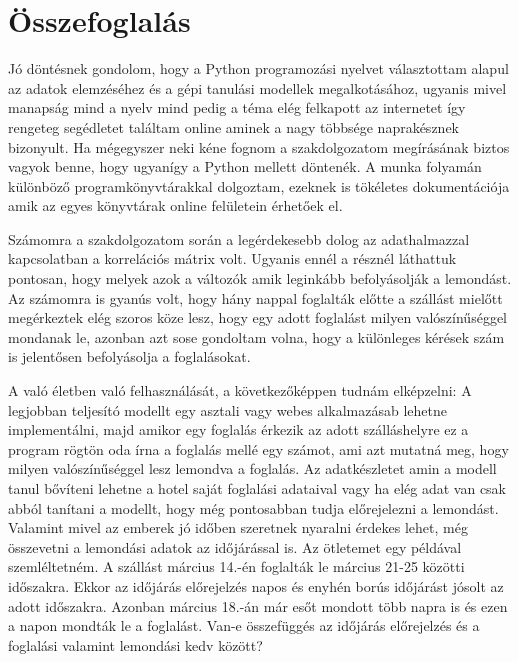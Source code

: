 \chapter{Összefoglalás}

Jó döntésnek gondolom, hogy a Python programozási nyelvet választottam alapul az adatok elemzéséhez és a gépi tanulási modellek megalkotásához, ugyanis mivel manapság mind a nyelv mind pedig a téma elég felkapott az internetet így rengeteg segédletet találtam online aminek a nagy többsége naprakésznek bizonyult. Ha mégegyszer neki kéne fognom a szakdolgozatom megírásának biztos vagyok benne, hogy ugyanígy a Python mellett döntenék. A munka folyamán különböző programkönyvtárakkal dolgoztam, ezeknek is tökéletes dokumentációja amik az egyes könyvtárak online felületein érhetőek el.

Számomra a szakdolgozatom során a legérdekesebb dolog az adathalmazzal kapcsolatban a korrelációs mátrix volt. Ugyanis ennél a résznél láthattuk pontosan, hogy melyek azok a változók amik leginkább befolyásolják a lemondást. Az számomra is gyanús volt, hogy hány nappal foglalták előtte a szállást mielőtt megérkeztek elég szoros köze lesz, hogy egy adott foglalást milyen valószínűséggel mondanak le, azonban azt sose gondoltam volna, hogy a különleges kérések szám is jelentősen befolyásolja a foglalásokat.

A való életben való felhasználását, a következőképpen tudnám elképzelni: A legjobban teljesító modellt egy asztali vagy webes alkalmazásab lehetne implementálni, majd amikor egy foglalás érkezik az adott szálláshelyre ez a program rögtön oda írna a foglalás mellé egy számot, ami azt mutatná meg, hogy milyen valószínűséggel lesz lemondva a foglalás. Az adatkészletet amin a modell tanul bővíteni lehetne a hotel saját foglalási adataival vagy ha elég adat van csak abból tanítani a modellt, hogy még pontosabban tudja előrejelezni a lemondást. Valamint mivel az emberek jó időben szeretnek nyaralni érdekes lehet, még összevetni a lemondási adatok az időjárással is. Az ötletemet egy példával szemléltetném. A szállást március 14.-én foglalták le március 21-25 közötti időszakra. Ekkor az időjárás előrejelzés napos és enyhén borús időjárást jósolt az adott időszakra. Azonban március 18.-án már esőt mondott több napra is és ezen a napon mondták le a foglalást. Van-e összefüggés az időjárás előrejelzés és a foglalási valamint lemondási kedv között?
